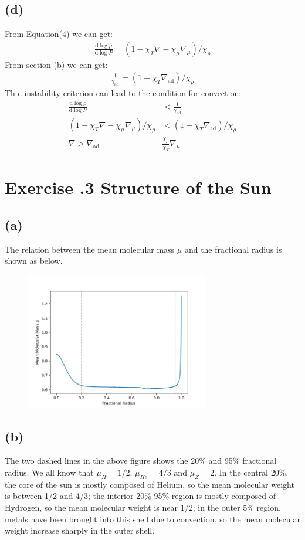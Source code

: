 \documentclass[a4paper,12pt]{article}
\renewcommand{\d}{\mathrm{d}}
\begin{document}
\subsection*{(d)}
From Equation(4) we can get:
\begin{align*}
    \frac{\d \log \rho}{\d \log P} = (1 - \chi_T \nabla - \chi_\mu \nabla_\mu)/\chi_\rho
\end{align*}
From section (b) we can get:
\begin{align*}
    \frac{1}{\gamma_\text{ad}} = (1 - \chi_T \nabla_\text{ad})/\chi_\rho
\end{align*}
Th e instability criterion can lead to the condition for convection:
\begin{align*}
    \frac{\d \log \rho}{\d \log P} &< \frac{1}{\gamma_\text{ad}} \\
    (1 - \chi_T \nabla - \chi_\mu \nabla_\mu)/\chi_\rho &< (1 - \chi_T \nabla_\text{ad})/\chi_\rho \\
    \nabla > \nabla_\text{ad} -& \frac{\chi_\mu}{\chi_T}\nabla_\mu
\end{align*}


\section*{\textbf{Exercise \uppercase\expandafter{}.3 Structure of the Sun}}
\subsection*{(a)}
The relation between the mean molecular mass $\mu$ and the fractional radius is shown as below.
\begin{figure}[htbp]
    \centering
    \includegraphics*[width=8cm]{mu.png}
\end{figure}

\subsection*{(b)}
The two dashed lines in the above figure shows the 20\% and 95\% fractional radius. 
We all know that $\mu_H = 1/2$, $\mu_{He}=4/3$ and $\mu_{Z} = 2$. In the central $20\%$, 
the core of the sun is mostly composed of Helium, so the mean molecular weight is between 1/2 and 
4/3; the interior 20\%-95\% region is mostly composed of Hydrogen, so the mean molecular weight is 
near 1/2; in the outer 5\% region, metals have been brought into this shell due to convection, so the 
mean molecular weight increase sharply in the outer shell.
\end{document}
